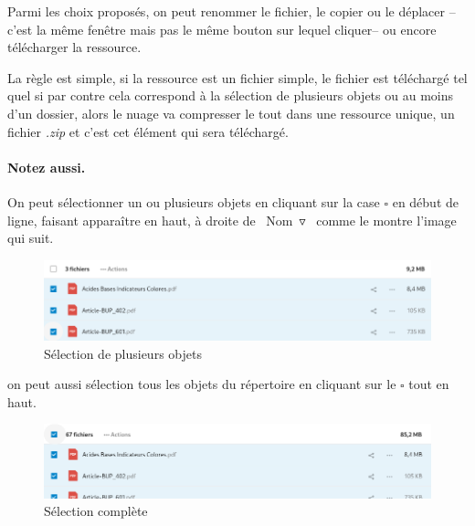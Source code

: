 Parmi les choix proposés, on peut renommer le fichier, le copier ou le déplacer --c'est la même fenêtre mais pas le même bouton sur lequel cliquer-- ou encore télécharger la ressource.

La règle est simple, si la ressource est un fichier simple, le fichier est téléchargé tel quel si par contre cela correspond à la sélection de plusieurs objets ou au moins d'un dossier, alors le nuage va compresser le tout dans une ressource unique, un fichier \emph{.zip} et c'est cet élément qui sera téléchargé.

\paragraph{Notez aussi.} 
On peut sélectionner un ou plusieurs objets en cliquant sur la case $\square$ en début de ligne, faisant apparaître en haut, à droite de \og~Nom~$\triangledown$~\fg{} comme le montre l'image qui suit.
\begin{figure}
	\centering
	\includegraphics{./Captures/nuage.selection.plusieurs.objets.png}
	\caption{Sélection de plusieurs objets}
\end{figure}
on peut aussi sélection tous les objets du répertoire en cliquant sur le $\square$ tout en haut.
\begin{figure}
	\centering
	\includegraphics{./Captures/nuage.selection.tous.objets.png}
	\caption{Sélection complète}
\end{figure}

